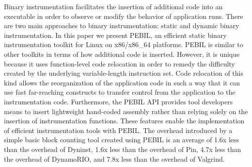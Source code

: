 \begin{it}

Binary instrumentation facilitates the insertion of additional code into an
executable in order to observe or modify the behavior of application runs. There
are two main approaches to binary instrumentation: static and dynamic binary
instrumentation. In this paper we present PEBIL, an efficient static binary
instrumentation toolkit for Linux on x86/x86\_64 platforms. PEBIL is similar to
other toolkits in terms of how additional code is inserted. However, it is
unique because it uses function-level code relocation in order to remedy the
difficulty created by the underlying variable-length instruction set. Code
relocation of this kind allows the reorganization of the application code in
such a way that it can use fast far-reaching constructs to transfer control from
the application to the instrumentation code. Furthermore, the PEBIL API provides
tool developers means to insert lightweight hand-coded assembly rather than
relying solely on the insertion of instrumentation functions. These features
enable the implementation of efficient instrumentation tools with PEBIL. The
overhead introduced by a simple basic block counting tool created using PEBIL is
an average of 1.6x less than the overhead of Dyninst, 1.6x less than the overhead 
of Pin, 4.7x less than the overhead of DynamoRIO, and 7.8x less than the 
overhead of Valgrind.

\end{it}
